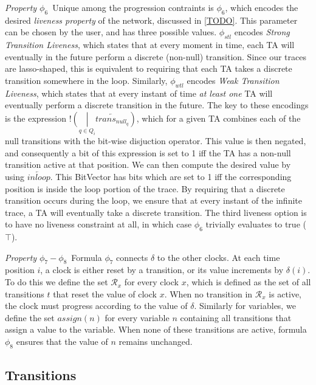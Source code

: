 \documentclass[a4paper,12pt]{article}
\newcommand*\BitOr{\mathbin{|}}
\newcommand{\BitNeg}{!}
\begin{document}
\emph{Property $\phi_6$}\ Unique among the progression contraints is $\phi_{6}$,
which encodes the desired \emph{liveness property} of the network, discussed in
\ref{TODO}. This parameter can be chosen by the user, and has three possible
values. $\phi_{stl}$ encodes \emph{Strong Transition Liveness}, which states
that at every moment in time, each TA will eventually in the future perform a
discrete (non-null) transition. Since our traces are lasso-shaped, this is
equivalent to requiring that each TA takes a discrete transition somewhere in
the loop. Similarly, $\phi_{wtl}$ encodes \emph{Weak Transition Liveness}, which
states that at every instant of time \emph{at least one} TA will eventually
perform a discrete transition in the future. The key to these encodings is the
expression
\(\BitNeg (\underset{q \in Q_{i}}{\BitOr} \overleftarrow{trans_{null_{q}}})\),
which for a given TA combines each of the null transitions with the bit-wise
disjuction operator. This value is then negated, and consequently a bit of this
expression is set to 1 iff the TA has a non-null transition active at that
position. We can then compute the desired value by using
\(\overleftarrow{inloop}\). This BitVector has bits which are set to 1 iff the
corresponding position is inside the loop portion of the trace. By requiring
that a discrete transition occurs during the loop, we ensure that at every
instant of the infinite trace, a TA will eventually take a discrete
transition. The third liveness option is to have no liveness constraint at all,
in which case $\phi_{6}$ trivially evaluates to true ($\top$).

\emph{Property $\phi_7 - \phi_{8}$}\ Formula \(\phi_7\) connects \(\delta\) to
the other clocks. At each time position \(i\), a clock is either reset by a
transition, or its value increments by \(\delta(i)\). To do this we define the
set \(\mathcal{R}_x\) for every clock \(x\), which is defined as the set of all
transitions \(t\) that reset the value of clock \(x\). When no transition in
\(\mathcal{R}_x\) is active, the clock must progress according to the value of
\(\delta\). Similarly for variables, we define the set \(assign(n)\) for every
variable \(n\) containing all transitions that assign a value to the variable.
When none of these transitions are active, formula \(\phi_8\) ensures that the
value of \(n\) remains unchanged.

\subsection{Transitions}\label{constraints-trans}
\end{document}
